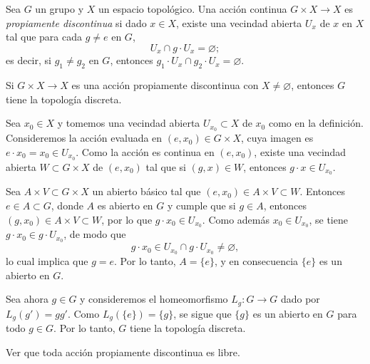 \begin{definicion}
Sea $G$ un grupo y $X$ un espacio topológico. Una acción continua $G \times X \to X$ es \textit{propiamente discontinua} si dado $x \in X$, existe una vecindad abierta $U_x$ de $x$ en $X$ tal que para cada $g \neq e$ en $G$,
\[
U_x \cap g \cdot U_x = \varnothing;
\]
es decir, si $g_1 \neq g_2$ en $G$, entonces $g_1 \cdot U_x \cap g_2 \cdot U_x = \varnothing$.
\end{definicion}

\begin{lema}
Si $G \times X \to X$ es una acción propiamente discontinua con $X \neq \varnothing$, entonces $G$ tiene la topología discreta.
\end{lema}

\begin{dem}
Sea $x_0 \in X$ y tomemos una vecindad abierta $U_{x_0} \subset X$ de $x_0$ como en la definición. Consideremos la acción evaluada en $(e, x_0) \in G \times X$, cuya imagen es $e \cdot x_0 = x_0 \in U_{x_0}$. Como la acción es continua en $(e, x_0)$, existe una vecindad abierta $W \subset G \times X$ de $(e, x_0)$ tal que si $(g, x) \in W$, entonces $g \cdot x \in U_{x_0}$.

Sea $A \times V \subset G \times X$ un abierto básico tal que $(e, x_0) \in A \times V \subset W$. Entonces $e \in A \subset G$, donde $A$ es abierto en $G$ y cumple que si $g \in A$, entonces $(g, x_0) \in A \times V \subset W$, por lo que $g \cdot x_0 \in U_{x_0}$. Como además $x_0 \in U_{x_0}$, se tiene $g \cdot x_0 \in g \cdot U_{x_0}$, de modo que
\[
g \cdot x_0 \in U_{x_0} \cap g \cdot U_{x_0} \neq \varnothing,
\]
lo cual implica que $g = e$. Por lo tanto, $A = \{e\}$, y en consecuencia $\{e\}$ es un abierto en $G$.

Sea ahora $g \in G$ y consideremos el homeomorfismo $L_g \colon G \to G$ dado por $L_g(g') = g g'$. Como $L_g(\{e\}) = \{g\}$, se sigue que $\{g\}$ es un abierto en $G$ para todo $g \in G$. Por lo tanto, $G$ tiene la topología discreta.
\end{dem}

\begin{ejercicio}
Ver que toda acción propiamente discontinua es libre.
\end{ejercicio}

